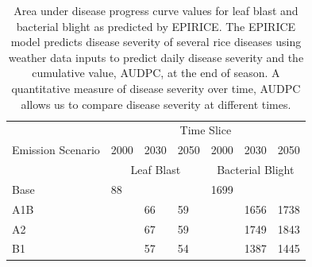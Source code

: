 \documentclass[preprint,12pt]{elsarticle}
\begin{document}

\begin{table}[H]
\begin{tabular}{@{}lllllll@{}}
\toprule
\multicolumn{1}{c}{\multirow{3}{*}{Emission Scenario}} & \multicolumn{6}{c}{Time Slice}                                                                                                                                  \\ \cmidrule(l){2-7} 
\multicolumn{1}{c}{}                                   & \multicolumn{1}{c}{2000} & \multicolumn{1}{c}{2030} & \multicolumn{1}{c}{2050} & \multicolumn{1}{c}{2000} & \multicolumn{1}{c}{2030} & \multicolumn{1}{c}{2050} \\ \cmidrule(l){2-7} 
\multicolumn{1}{c}{}                                   & \multicolumn{3}{c}{Leaf Blast}                                                 & \multicolumn{3}{c}{Bacterial Blight}                                           \\ \midrule
Base                                                   & 88                       &                          &                          & 1699                     &                          &                          \\
A1B                                                    &                          & 66                       & 59                       &                          & 1656                     & 1738                     \\
A2                                                     &                          & 67                       & 59                       &                          & 1749                     & 1843                     \\
B1                                                     &                          & 57                       & 54                       &                          & 1387                     & 1445                     \\ \bottomrule
\end{tabular}
\caption{Area under disease progress curve values for leaf blast and bacterial blight as predicted by EPIRICE. The EPIRICE model predicts disease severity of several rice diseases using weather data inputs to predict daily disease severity and the cumulative value, AUDPC, at the end of season. A quantitative measure of disease severity over time, AUDPC allows us to compare disease severity at different times.}
\label{AUDPCTable}
\end{table}
\end{document}
